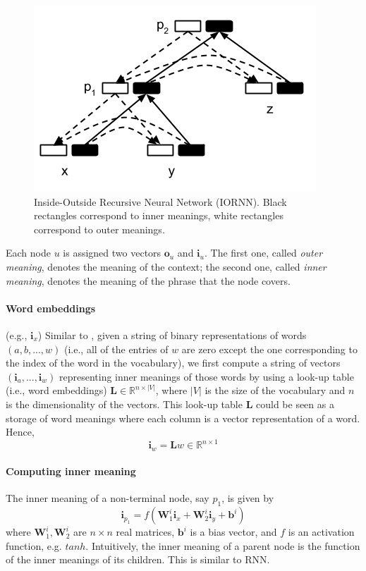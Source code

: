 \documentclass[11pt]{article}
\begin{document}
\begin{figure}[h!]
	\center
	\includegraphics[scale=0.5]{IORNN.png}
	\caption{Inside-Outside Recursive Neural Network (IORNN). 
	Black rectangles correspond to inner meanings, 
	white rectangles correspond to outer meanings.}
	\label{figure iornn}
\end{figure}


Each node $u$ is assigned two vectors $\mathbf{o}_u$ and $\mathbf{i}_u$. The first one,
called \textit{outer meaning}, denotes the meaning of the context; the second one, 
called \textit{inner meaning}, denotes the meaning of the phrase that the node covers.

\paragraph{Word embeddings} (e.g., $\mathbf{i}_x$)
Similar to , given a string of binary
representations of words $(a, b, ..., w)$ (i.e., all of the entries of $w$ are zero except the one 
corresponding to the index of the word in the vocabulary), 
we first compute a string of vectors $(\mathbf{i}_{a},...,\mathbf{i}_{w})$ 
representing inner meanings of those words by using 
a look-up table (i.e., word embeddings) $\mathbf{L} \in \mathbb{R}^{n \times |V|}$, 
where $|V|$ is the size of the vocabulary and $n$ is the dimensionality of the vectors. 
This look-up table $\mathbf{L}$ could be seen as a storage of word meanings where each column 
is a vector representation of a word. Hence, 
\begin{equation}
    \label{equation compute word vector}
    \mathbf{i}_{w} = \mathbf{L} w \in \mathbb{R}^{n \times 1}
\end{equation}

\paragraph{Computing inner meaning} The inner meaning of a non-terminal node, say $p_1$, is given by
\begin{equation}
	\mathbf{i}_{p_1} = f(\mathbf{W}_1^i \mathbf{i}_{x} + \mathbf{W}_2^i \mathbf{i}_{y} + \mathbf{b}^i)
	\label{equation inner}
\end{equation}
where $\mathbf{W}_1^i, \mathbf{W}_2^i$ are $n \times n$ real matrices, 
$\mathbf{b}^i$ is a bias vector, and $f$ is an activation function, e.g. $tanh$. 
Intuitively, the inner meaning of a parent node is the function of the inner meanings 
of its children. This is similar to RNN.
\end{document}

